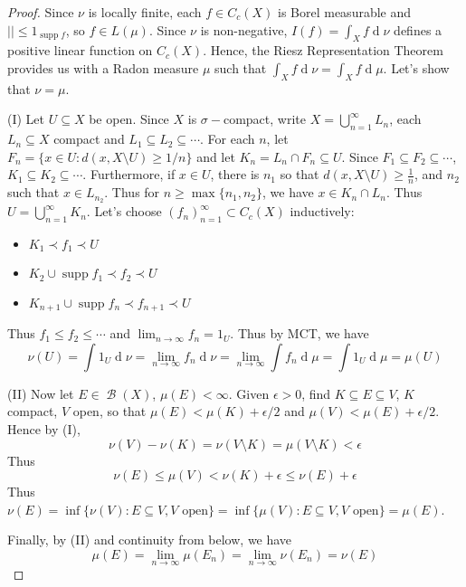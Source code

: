 \documentclass[12pt, a4paper]{memoir}
\theoremstyle{nonumberplain}
\newtheorem{proof}{Proof}
\DeclareMathOperator{\B}{\mathcal{B}}
\DeclareMathOperator{\supp}{supp}
\renewcommand{\d}[1]{\ensuremath{\operatorname{d}\!{#1}}} %
\begin{document}
\begin{proof}
    Since $\nu$ is locally finite, each $f\in C_c(X)$ is Borel measurable and $||\leq 1_{\supp f}$, so $f\in L(\mu)$.
    Since $\nu$ is non-negative, $I(f)=\int_X f\d{\nu}$ defines a positive linear function on $C_c(X)$.
    Hence, the Riesz Representation Theorem provides us with a Radon measure $\mu$ such that $\int_X f\d{\nu}=\int_X f\d{\mu}$.
    Let's show that $\nu=\mu$.

    (I) Let $U\subseteq X$ be open.
    Since $X$ is $\sigma-$compact, write $X=\bigcup_{n=1}^\infty L_n$, each $L_n\subseteq X$ compact and $L_1\subseteq L_2\subseteq\cdots$.
    For each $n$, let $F_n=\{x\in U: d(x,X\setminus U)\geq1/n\}$ and let $K_n=L_n\cap F_n\subseteq U$.
    Since $F_1\subseteq F_2\subseteq\cdots$, $K_1\subseteq K_2\subseteq\cdots$.
    Furthermore, if $x\in U$, there is $n_1$ so that $d(x,X\setminus U)\geq \frac{1}{n}$, and $n_2$ such that $x\in L_{n_2}$.
    Thus for $n\geq\max\{n_1,n_2\}$, we have $x\in K_n\cap L_n$.
    Thus $U=\bigcup_{n=1}^\infty K_n$.
    Let's choose $(f_n)_{n=1}^\infty\subset C_c(X)$ inductively:
    \begin{itemize}[nl]
        \item $K_1\prec f_1\prec U$
        \item $K_2\cup \supp f_1\prec f_2\prec U$
        \item $K_{n+1}\cup\supp f_n\prec f_{n+1}\prec U$
    \end{itemize}
    Thus $f_1\leq f_2\leq\cdots$ and $\lim_{n\to\infty}f_n=1_U$.
    Thus by MCT, we have
    \begin{equation*}
        \nu(U)=\int 1_U\d{\nu}=\lim_{n\to\infty}f_n\d{\nu}=\lim_{n\to\infty}\int f_n\d{\mu}=\int 1_U\d{\mu}=\mu(U)
    \end{equation*}

    (II) Now let $E\in\B(X)$, $\mu(E)<\infty$.
    Given $\epsilon>0$, find $K\subseteq E\subseteq V$, $K$ compact, $V$ open, so that $\mu(E)<\mu(K)+\epsilon/2$ and $\mu(V)<\mu(E)+\epsilon/2$.
    Hence by (I),
    \begin{equation*}
        \nu(V)-\nu(K) = \nu(V\setminus K) =\mu(V\setminus K)<\epsilon
    \end{equation*}
    Thus
    \begin{equation*}
        \nu(E)\leq\mu(V)<\nu(K)+\epsilon\leq\nu(E)+\epsilon
    \end{equation*}
    Thus $\nu(E)=\inf\{\nu(V):E\subseteq V,V\text{ open}\}=\inf\{\mu(V):E\subseteq V,V\text{ open}\}=\mu(E)$.

    Finally, by (II) and continuity from below, we have
    \begin{equation*}
        \mu(E)=\lim_{n\to\infty}\mu(E_n)=\lim_{n\to\infty}\nu(E_n)=\nu(E)
    \end{equation*}
\end{proof}
\end{document}
